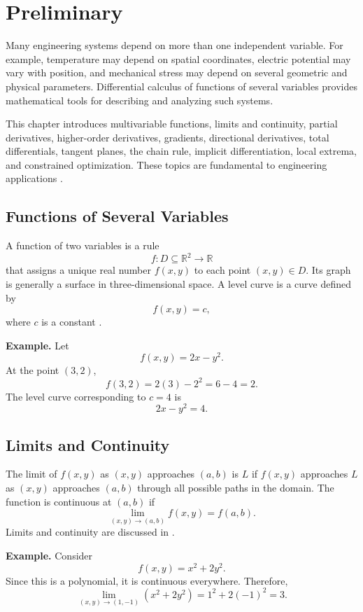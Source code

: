 \documentclass[a4paper,12pt]{article}
\theoremstyle{mystyle}
\numberwithin{equation}{section}
\numberwithin{theorem}{section}
\numberwithin{proposition}{section}
\numberwithin{example}{section}
\numberwithin{remark}{section}
\numberwithin{lemma}{section}
\numberwithin{corollary}{section}
\numberwithin{definition}{section}
\begin{document}
\section{Preliminary}
\label{S:2}
Many engineering systems depend on more than one independent
variable. For example, temperature may depend on spatial coordinates,
electric potential may vary with position, and mechanical stress may
depend on several geometric and physical parameters. Differential
calculus of functions of several variables provides mathematical tools
for describing and analyzing such systems.

This chapter introduces multivariable functions, limits and continuity,
partial derivatives, higher-order derivatives, gradients, directional
derivatives, total differentials, tangent planes, the chain rule,
implicit differentiation, local extrema, and constrained optimization.
These topics are fundamental to engineering applications
\cite{openstax2016}.

\subsection{Functions of Several Variables}

A function of two variables is a rule
\[
f:D\subseteq\mathbb{R}^{2}\longrightarrow\mathbb{R}
\]
that assigns a unique real number \(f(x,y)\) to each point
\((x,y)\in D\). Its graph is generally a surface in three-dimensional
space. A level curve is a curve defined by
\[
f(x,y)=c,
\]
where \(c\) is a constant \cite{openstax2016}.

\textbf{Example.} Let
\[
f(x,y)=2x-y^{2}.
\]
At the point \((3,2)\),
\[
f(3,2)=2(3)-2^{2}=6-4=2.
\]
The level curve corresponding to \(c=4\) is
\[
2x-y^{2}=4.
\]

\subsection{Limits and Continuity}

The limit of \(f(x,y)\) as \((x,y)\) approaches \((a,b)\) is \(L\) if
\(f(x,y)\) approaches \(L\) as \((x,y)\) approaches \((a,b)\) through
all possible paths in the domain. The function is continuous at
\((a,b)\) if
\[
\lim_{(x,y)\to(a,b)}f(x,y)=f(a,b).
\]
Limits and continuity are discussed in \cite{openstaxlimits}.

\textbf{Example.} Consider
\[
f(x,y)=x^{2}+2y^{2}.
\]
Since this is a polynomial, it is continuous everywhere. Therefore,
\[
\lim_{(x,y)\to(1,-1)}(x^{2}+2y^{2})
=1^{2}+2(-1)^{2}=3.
\]
\end{document}
